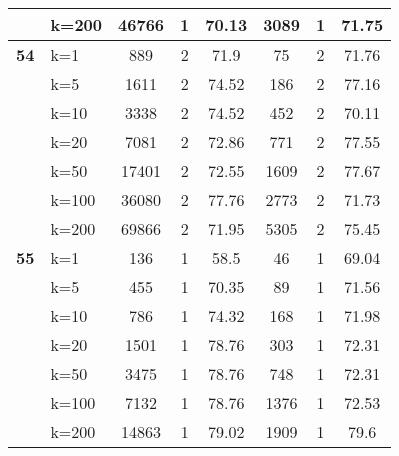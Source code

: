 \begin{table}[htbp]
\begin{tabular}{|l|l|c|c|c|c|c|c|}
     & k=200 & 46766 & 1 & 70.13 & 3089 & 1 & 71.75 \\ \hline
    \multicolumn{1}{|r|}{\textbf{54}} & k=1 & 889 & 2 & 71.9 & 75 & 2 & 71.76 \\ 
     & k=5 & 1611 & 2 & 74.52 & 186 & 2 & 77.16 \\ 
     & k=10 & 3338 & 2 & 74.52 & 452 & 2 & 70.11 \\ 
     & k=20 & 7081 & 2 & 72.86 & 771 & 2 & 77.55 \\ 
     & k=50 & 17401 & 2 & 72.55 & 1609 & 2 & 77.67 \\ 
     & k=100 & 36080 & 2 & 77.76 & 2773 & 2 & 71.73 \\ 
     & k=200 & 69866 & 2 & 71.95 & 5305 & 2 & 75.45 \\ \hline
    \multicolumn{1}{|r|}{\textbf{55}} & k=1 & 136 & 1 & 58.5 & 46 & 1 & 69.04 \\ 
     & k=5 & 455 & 1 & 70.35 & 89 & 1 & 71.56 \\ 
     & k=10 & 786 & 1 & 74.32 & 168 & 1 & 71.98 \\ 
     & k=20 & 1501 & 1 & 78.76 & 303 & 1 & 72.31 \\ 
     & k=50 & 3475 & 1 & 78.76 & 748 & 1 & 72.31 \\ 
     & k=100 & 7132 & 1 & 78.76 & 1376 & 1 & 72.53 \\ 
     & k=200 & 14863 & 1 & 79.02 & 1909 & 1 & 79.6 \\ \hline
    \end{tabular}
\end{table}
